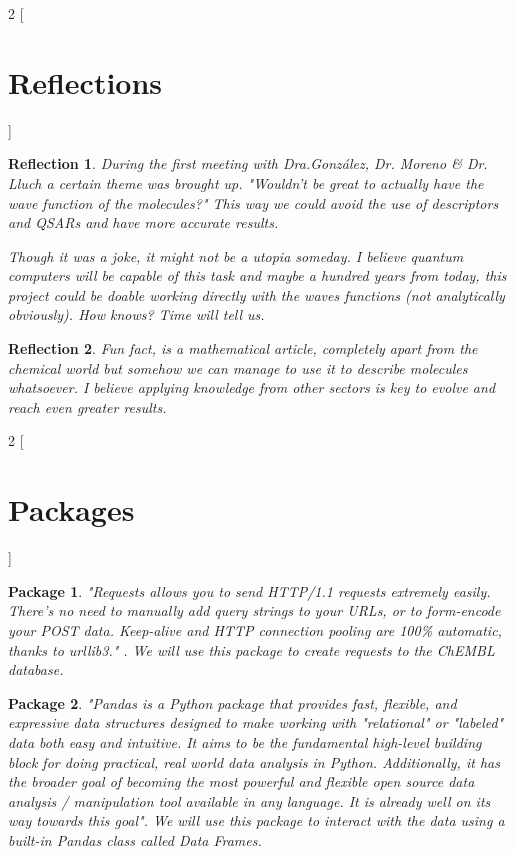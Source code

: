 \documentclass[12pt,letterpaper]{article}
\newtheorem{reflection}{Reflection}
\newtheorem{PyPackage}{Package}
\begin{document}
\newpage


\begin{multicols}{2}
[
\section{Reflections}
]
\begin{reflection}
During the first meeting with Dra.González, Dr. Moreno \& Dr. Lluch a certain theme was brought up. "Wouldn't be great to actually have the wave function of the molecules?" This way we could avoid the use of descriptors and QSARs and have more accurate results. \par
Though it was a joke, it might not be a utopia someday. I believe quantum computers will be capable of this task and maybe a hundred years from today, this project could be doable working directly with the waves functions (not analytically obviously). How knows? Time will tell us.
\end{reflection}
\begin{reflection}
Fun fact, \cite{ZagrebIndicesArticle} is a mathematical article, completely apart from the chemical world but somehow we can manage to use it to describe molecules whatsoever. I believe applying knowledge from other sectors is key to evolve and reach even greater results.
\end{reflection}
\end{multicols}

\begin{multicols}{2}
[
\section{Packages}
]
\begin{PyPackage}
"Requests allows you to send HTTP/1.1 requests extremely easily. There’s no need to manually add query strings to your URLs, or to form-encode your POST data. Keep-alive and HTTP connection pooling are 100\% automatic, thanks to urllib3."
\cite{PythonPackageRequests}. We will use this package to create requests to the ChEMBL database.
\end{PyPackage}

\begin{PyPackage}
"Pandas is a Python package that provides fast, flexible, and expressive data structures designed to make working with "relational" or "labeled" data both easy and intuitive. It aims to be the fundamental high-level building block for doing practical, real world data analysis in Python. Additionally, it has the broader goal of becoming the most powerful and flexible open source data analysis / manipulation tool available in any language. It is already well on its way towards this goal"\cite{PythonPackagePandas}. We will use this package to interact with the data using a built-in Pandas class called \emph{Data Frames}.
\end{PyPackage}
\end{multicols}
\end{document}

